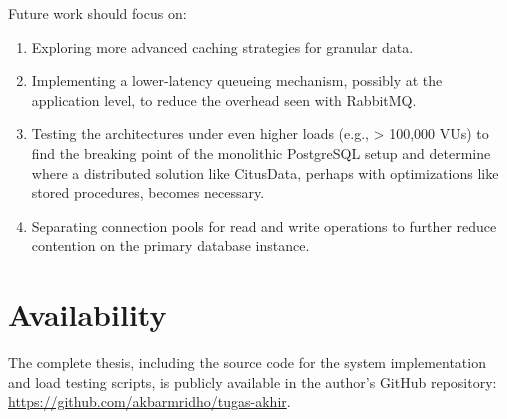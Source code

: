 Future work should focus on:
\begin{enumerate}
    \item Exploring more advanced caching strategies for granular data.
    \item Implementing a lower-latency queueing mechanism, possibly at the application level, to reduce the overhead seen with RabbitMQ.
    \item Testing the architectures under even higher loads (e.g., \textgreater
          100,000 VUs) to find the breaking point of the monolithic PostgreSQL setup and determine where a distributed solution like CitusData, perhaps with optimizations like stored procedures, becomes necessary.
    \item Separating connection pools for read and write operations to further reduce contention on the primary database instance.
\end{enumerate}

\section{Availability}
The complete thesis, including the source code for the system implementation and load testing scripts, is publicly available in the author's GitHub repository: \url{https://github.com/akbarmridho/tugas-akhir}.